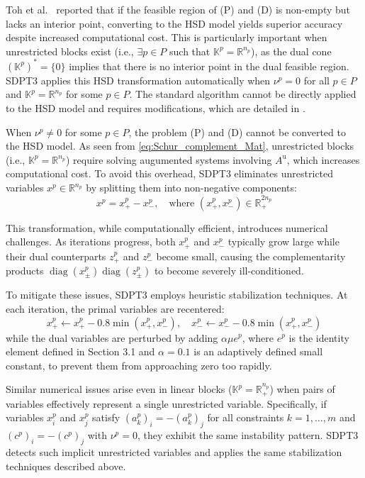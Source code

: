 Toh et al.~\cite{toh1999} reported that if the feasible region of (P) and (D) is non-empty but lacks an interior point, converting to the HSD model yields superior accuracy despite increased computational cost.
This is particularly important when unrestricted blocks exist (i.e., $\exists p\in P$ such that $\mathbb{K}^p=\mathbb{R}^{n_p}$), as the dual cone $(\mathbb{K}^p)^*=\{0\}$ implies that there is no interior point in the dual feasible region.
SDPT3 applies this HSD transformation automatically when $\nu^p = 0$ for all $p \in P$ and $\mathbb{K}^p=\mathbb{R}^{n_p}$ for some $p\in P$.
The standard algorithm cannot be directly applied to the HSD model and requires modifications, which are detailed in \cite{toh1999}.

\medskip

When $\nu^p \neq 0$ for some $p \in P$, the problem (P) and (D) cannot be converted to the HSD model.
As seen from \eqref{eq:Schur_complement_Mat}, unrestricted blocks (i.e., $\mathbb{K}^p = \mathbb{R}^{n_p}$) require solving augumented systems involving $A^{\text{u}}$, which increases computational cost.
To avoid this overhead, SDPT3 eliminates unrestricted variables $x^p \in \mathbb{R}^{n_p}$ by splitting them into non-negative components:
\[
   x^p = x^p_+ - x^p_-, \quad \text{where } (x^p_+, x^p_-) \in \mathbb{R}^{2n_p}_+
\]

This transformation, while computationally efficient, introduces numerical challenges.
As iterations progress, both $x^p_+$ and $x^p_-$ typically grow large while their dual counterparts $z^p_+$ and $z^p_-$ become small, causing the complementarity products $\operatorname{diag}(x^p_\pm) \operatorname{diag}(z^p_\pm)$ to become severely ill-conditioned.

To mitigate these issues, SDPT3 employs heuristic stabilization techniques.
At each iteration, the primal variables are recentered:
\[
   x^p_+ \leftarrow x^p_+ - 0.8 \min(x^p_+, x^p_-), \quad
   x^p_- \leftarrow x^p_- - 0.8 \min(x^p_+, x^p_-)
\]
while the dual variables are perturbed by adding $\alpha \mu e^p$, where $e^p$ is the identity element defined in Section 3.1 and $\alpha = 0.1$ is an adaptively defined small constant, to prevent them from approaching zero too rapidly.

\medskip

Similar numerical issues arise even in linear blocks ($\mathbb{K}^p=\mathbb{R}^{n_p}_+$) when pairs of variables effectively represent a single unrestricted variable.
Specifically, if variables $x^p_i$ and $x^p_j$ satisfy $(a^p_k)_i = -(a^p_k)_j$ for all constraints $k=1,\ldots,m$ and $(c^p)_i = -(c^p)_j$ with $\nu^p = 0$, they exhibit the same instability pattern.
SDPT3 detects such implicit unrestricted variables and applies the same stabilization techniques described above.


